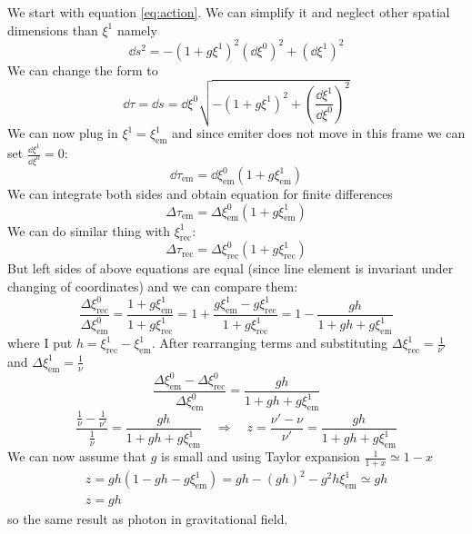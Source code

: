 We start with equation \autoref{eq:action}. We can simplify it and neglect other
spatial dimensions than $\xi^1$ namely
%
\begin{equation}
	\dd s^2 = -(1+g\xi^1)^2 (\dd\xi^0)^2 + (\dd\xi^1)^2
\end{equation}
%
We can change the form to
%
\begin{equation}
	\dd \tau = \dd s = \dd\xi^0 \sqrt{-(1+g\xi^1)^2 + \left(\frac{\dd\xi^1}{\dd\xi^0}\right)^2}
\end{equation}
%
We can now plug in $\xi^1 = \xi^1_\text{em}$ and since emiter does not move in
this frame we can set $\frac{\dd\xi^1}{\dd\xi^0} = 0$:
%
\begin{equation}
	\dd \tau_\text{em} = \dd\xi^0_\text{em} (1+g\xi^1_\text{em})
\end{equation}
%
We can integrate both sides and obtain equation for finite differences
%
\begin{equation}
	\Delta \tau_\text{em} = \Delta \xi^0_\text{em} (1+g\xi^1_\text{em})
\end{equation}
%
We can do similar thing with $\xi^1_\text{rec}$:
%
\begin{equation}
	\Delta \tau_\text{rec} = \Delta \xi^0_\text{rec} (1+g\xi^1_\text{rec})
\end{equation}
%
But left sides of above equations are equal (since line element is invariant
under changing of coordinates) and we can compare them:
%
\begin{equation}
	\frac{\Delta \xi^0_\text{rec}}{\Delta \xi^0_\text{em}} =
	\frac{1+g\xi^1_\text{em}}{1+g\xi^1_\text{rec}} =
	1 + \frac{g\xi^1_\text{em} - g\xi^1_\text{rec}}{1+g\xi^1_\text{rec}} =
	1 - \frac{gh}{1+gh+g\xi^1_\text{em}}
\end{equation}
%
where I put $h = \xi^1_\text{rec} - \xi^1_\text{em}$. After rearranging terms and
substituting $\Delta \xi_\text{rec}^1 = \frac{1}{\nu'}$ and $\Delta
	\xi_\text{em}^1 = \frac{1}{\nu}$
%
\begin{equation}
	\frac{\Delta \xi^0_\text{em} - \Delta \xi^0_\text{rec}}{\Delta \xi^0_\text{em}} =
	\frac{gh}{1+gh+g\xi^1_\text{em}}
\end{equation}
%
\begin{equation}
	\frac{\frac{1}{\nu} - \frac{1}{\nu'}}{\frac{1}{\nu}} =
	\frac{gh}{1+gh+g\xi^1_\text{em}}
	\quad \Rightarrow \quad
	\boxed{z = \frac{\nu' - \nu}{\nu'} = \frac{gh}{1+gh+g\xi^1_\text{em}}}
\end{equation}
%
We can now assume that $g$ is small and using Taylor expansion $\frac{1}{1+x}
	\simeq 1-x$
%
\begin{gather}
	z = gh(1-gh-g\xi^1_\text{em}) = gh - (gh)^2 - g^2h\xi^1_\text{em} \simeq gh \nonumber \\
	z = gh
\end{gather}
%
so the same result as photon in gravitational field.